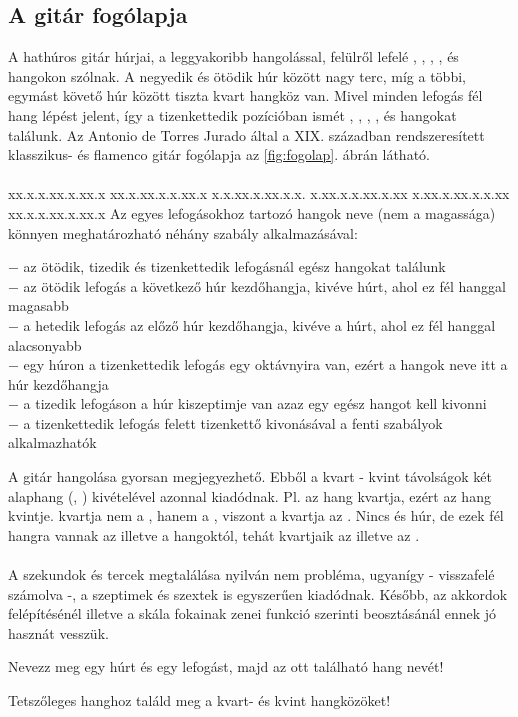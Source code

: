 \label{tab:hangkozok}
\subsection{A gitár fogólapja}
\label{sec:gitarfogolap}
A hathúros gitár húrjai, a leggyakoribb hangolással, felülről lefelé , , , ,  és  hangokon szólnak. A negyedik és ötödik húr között nagy terc, míg a többi, egymást követő húr között tiszta kvart hangköz van. Mivel minden lefogás fél hang lépést jelent, így a tizenkettedik pozícióban ismét , , , ,  és  hangokat találunk. Az Antonio de Torres Jurado által a XIX. században rendszeresített klasszikus- és flamenco gitár fogólapja az \ref{fig:fogolap}. ábrán látható.\\\\
          {xx.x.x.xx.x.xx.x%
           xx.x.xx.x.x.xx.x%
           x.x.xx.x.xx.x.x.%
           x.xx.x.x.xx.x.xx%
           x.xx.x.xx.x.x.xx%
           xx.x.x.xx.x.xx.x}
Az egyes lefogásokhoz tartozó hangok neve (nem a magassága) könnyen meghatározható néhány szabály alkalmazásával:
\begin{pitemize}
$-$ az ötödik, tizedik és tizenkettedik lefogásnál egész hangokat találunk  \\
$-$ az ötödik lefogás a következő húr kezdőhangja, kivéve  húrt, ahol ez fél hanggal magasabb  \\
$-$ a hetedik lefogás az előző húr kezdőhangja, kivéve a  húrt, ahol ez fél hanggal alacsonyabb \\
$-$ egy húron a tizenkettedik lefogás egy oktávnyira van, ezért a hangok neve itt a húr kezdőhangja \\
$-$ a tizedik lefogáson a húr kiszeptimje van azaz egy egész hangot kell kivonni \\
$-$ a tizenkettedik lefogás felett tizenkettő kivonásával a fenti szabályok alkalmazhatók \\
\end{pitemize}
A gitár hangolása gyorsan megjegyezhető. Ebből a kvart - kvint távolságok két alaphang (, ) kivételével azonnal kiadódnak. Pl.  az  hang kvartja, ezért  az  hang kvintje.  kvartja nem a , hanem a , viszont a  kvartja az . Nincs  és  húr, de ezek fél hangra vannak az  illetve a  hangoktól, tehát kvartjaik az  illetve az . \\\\
A szekundok és tercek megtalálása nyilván nem probléma, ugyanígy - visszafelé számolva -, a szeptimek és szextek is egyszerűen kiadódnak. Később, az akkordok felépítésénél illetve a skála fokainak zenei funkció szerinti beosztásánál ennek jó hasznát vesszük.
\begin{practices}
\item Nevezz meg egy húrt és egy lefogást, majd az ott található hang nevét!
\item Tetszőleges hanghoz találd meg a kvart- és kvint hangközöket!
\end{practices}
